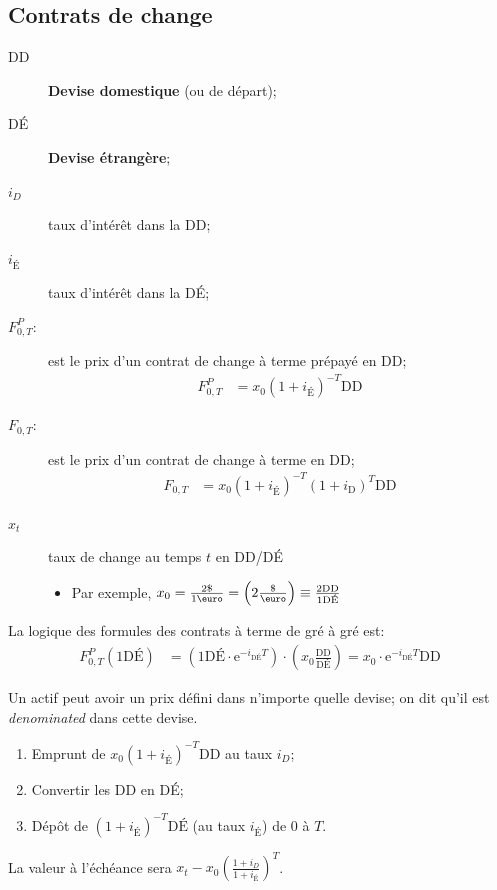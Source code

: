 \documentclass[10pt, french]{article}
\begin{document}
\begin{multicols*}{2}
\subsection{Contrats de change}
\begin{distributions}
\begin{description}
	\item[DD] \textbf{Devise domestique} (ou de départ);
	\item[DÉ] \textbf{Devise étrangère};
	\item[$i_{D}$]	taux d'intérêt dans la DD;
	\item[$i_{\text{É}}$]	taux d'intérêt dans la DÉ;
	\item[$F_{0, T}^{P}$:]	est le prix d'un contrat de change à terme prépayé en DD;
	\begin{align*}
	F_{0, T}^{P} &= x_{0}(1 + i_{\text{É}})^{-T}\text{DD}
	\end{align*}		
	\item[$F_{0, T}$:]	est le prix d'un contrat de change à terme en DD;
	\begin{align*}
	F_{0, T} &= x_{0}(1 + i_{\text{É}})^{-T}(1 + i_{\text{D}})^{T}\text{DD}	
	\end{align*}		
	\item[$x_{t}$]	taux de change au temps $t$ en DD/DÉ
		\begin{itemize}[leftmargin = *]
		\item	Par exemple, $x_{0} = \frac{2\$}{\text{1\euro}} = \left(2 \frac{\$}{\text{\euro}}\right) \equiv \frac{2\text{DD}}{1\text{DÉ}}$
		\end{itemize}
\end{description}

La logique des formules des contrats à terme de gré à gré est:
\begin{align*}
	F_{0, T}^{P}(1 \text{DÉ})
	&=	\left(1\text{DÉ} \cdot \textrm{e}^{-i_{\text{DÉ}}T}\right) \cdot \left( x_{0}\frac{\text{DD}}{\text{DÉ}} \right)	
	=	x_{0} \cdot \textrm{e}^{-i_{\text{DÉ}}T}\text{DD}
\end{align*}
\end{distributions}

Un actif peut avoir un prix défini dans n'importe quelle devise; on dit qu'il est \og \textit{denominated} \fg{} dans cette devise.

\begin{definitionNOHFILL}
\begin{enumerate}
	\item	Emprunt de $x_0(1 + i_{\text{É}})^{-T}\text{DD}$ au taux $i_D$;
	\item 	Convertir les DD en DÉ;
	\item	Dépôt de $(1 + i_{É})^{-T}\text{DÉ}$ (au taux $i_{É}$) de 0 à $T$.
\end{enumerate}
La valeur à l'échéance sera $x_t - x_0 \left(\frac{1 + i_D}{1 + i_{\text{É}}}\right)^{T}$.
\end{definitionNOHFILL}


\end{multicols*}
\end{document}
